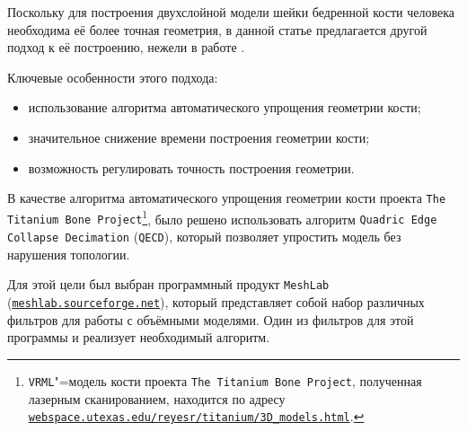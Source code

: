 




\smallskip




Поскольку для построения  двухслойной модели шейки бедренной кости человека необходима её более точная геометрия, в данной статье предлагается другой подход к её построению, нежели в работе \cite{nekh:b2}. 

Ключевые особенности этого подхода:

\begin{itemize}

\item использование алгоритма автоматического упрощения геометрии кости;

\item значительное снижение времени построения геометрии кости;

\item возможность регулировать точность построения геометрии.

\end{itemize}





В качестве алгоритма автоматического упрощения геометрии кости проекта {\tt The Titanium Bone Project}\footnote{{\tt VRML}"=модель кости проекта {\tt The Titanium Bone Project}, полученная лазерным сканированием,  находится по адресу \href{https://webspace.utexas.edu/reyesr/titanium/3D_models.html}{\tt webspace.utexas.edu/reyesr/titanium/3D\_models.html}.}\!\!, было решено использовать алгоритм {\tt Quad\-ric Edge Collapse Decimation} ({\tt QECD}), который позволяет упростить модель без нарушения топологии. 

Для этой цели был выбран программный продукт {\tt MeshLab} (\href{http://meshlab.sourceforge.net}{\tt meshlab.sourceforge.net}), который  представляет собой набор различных фильтров для работы с объёмными моделями. Один из фильтров для этой программы и реализует необходимый алгоритм. 

